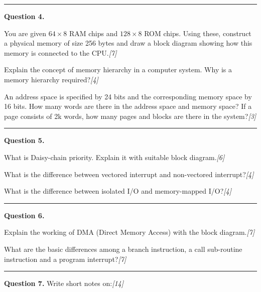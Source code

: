 \documentclass[11pt,a4paper]{article}
\newcommand{\pts}[1]{\hfill   \textit{[#1]}}
\begin{document}
\medskip\rule{\linewidth}{0.2pt}\medskip




\noindent   \textbf{Question 4.}

\begin{parts}
  \item You are given $64  \times 8$ RAM chips and $128  \times 8$ ROM chips. Using these, construct a physical memory of size 256 bytes and draw a block diagram showing how this memory is connected to the CPU.\pts{7}
  \item Explain the concept of memory hierarchy in a computer system. Why is a memory hierarchy required?\pts{4}
  \item An address space is specified by 24 bits and the corresponding memory space by 16 bits. How many words are there in the address space and memory space? If a page consists of 2k words, how many pages and blocks are there in the system?\pts{3}
\end{parts}

\medskip\rule{\linewidth}{0.2pt}\medskip




\noindent   \textbf{Question 5.}

\begin{parts}
  \item What is Daisy-chain priority. Explain it with suitable block diagram.\pts{6}
  \item What is the difference between vectored interrupt and non-vectored interrupt?\pts{4}
  \item What is the difference between isolated I/O and memory-mapped I/O?\pts{4}
\end{parts}

\medskip\rule{\linewidth}{0.2pt}\medskip




\noindent   \textbf{Question 6.}

\begin{parts}
  \item Explain the working of DMA (Direct Memory Access) with the block diagram.\pts{7}
  \item What are the basic differences among a branch instruction, a call sub-routine instruction and a program interrupt?\pts{7}
\end{parts}

\medskip\rule{\linewidth}{0.2pt}\medskip




\noindent   \textbf{Question 7.} Write short notes on:\pts{14}
\end{document}
